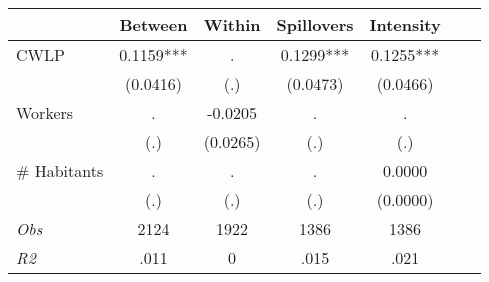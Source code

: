 \begin{tabular}{l*{6}{c}}\hline&\multicolumn{1}{c}{Between}&\multicolumn{1}{c}{Within}&\multicolumn{1}{c}{Spillovers}&\multicolumn{1}{c}{Intensity}\\ \hline 
CWLP & 0.1159*** & . & 0.1299*** & 0.1255*** \\
 & (0.0416) & (.) & (0.0473) & (0.0466) \\
Workers & . & -0.0205 & . & . \\
 & (.) & (0.0265) & (.) & (.) \\
\# Habitants & . & . & . & 0.0000 \\
  & (.) & (.) & (.) & (0.0000) \\
\hline \textit{Obs} & 2124 & 1922 & 1386 & 1386  \\ \textit{R2} & .011 & 0 & .015 & .021 \\ \hline \end{tabular}
